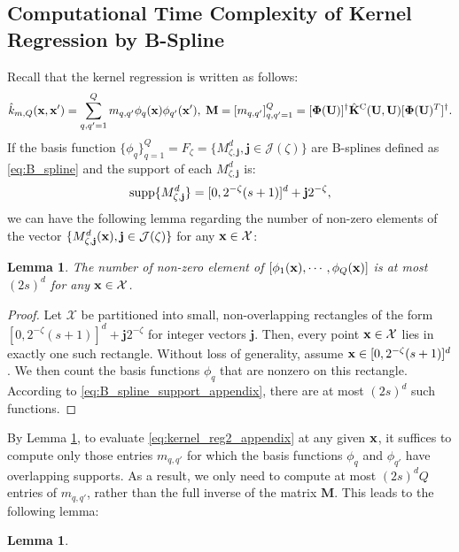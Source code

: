 \documentclass[aos,preprint]{imsart}
\theoremstyle{plain}
\newtheorem{lemma}[theorem]{Lemma}
\newcommand{\CalX}{\mathcal X}
\newcommand{\BFx}{\bold x}
\newcommand{\BU}{\bold U}
\newcommand{\BK}{\bold K}
\newcommand{\BPhi}{\boldsymbol{\Phi}}
\theoremstyle{remark}
\begin{document}
\begin{appendix}
\section{Computational Time Complexity of  Kernel Regression by B-Spline}
\label{sec:B_spline_time_complexity}
Recall that the kernel regression is written as follows:
\begin{equation}
\label{eq:kernel_reg2_appendix}
 \hat{k}_{m,Q}(\BFx, \BFx') = \sum_{q,q'=1}^Q m_{q,q'}{\phi}_q(\BFx) {\phi}_{q'}(\BFx'), \; \mathbf{M} = [m_{q,q'}]_{q,q'=1}^Q = [\BPhi(\BU)]^\dagger \hat{\BK}^{\rm C}(\BU, \BU) [\BPhi(\BU)^T]^\dagger.
\end{equation}
If the basis function $\{\phi_q\}_{q=1}^Q=F_\zeta=\{M_{\zeta, \mathbf{j}}^d, \mathbf{j}\in \mathcal{J}(\zeta)\}$ are B-splines defined as \eqref{eq:B_spline} and the support of each $M_{\zeta, \mathbf{j}}^d$ is:
\begin{equation}
\label{eq:B_spline_support_appendix}
    {\rm supp}\{M_{\zeta, \mathbf{j}}^d\}=[0,2^{-\zeta}(s+1)]^d+\bold{j}2^{-\zeta},
\end{equation}
we can have the following lemma regarding the number of non-zero elements of the vector $\{M_{\zeta, \mathbf{j}}^d(\BFx), \mathbf{j}\in \mathcal{J}(\zeta)\}$ for any $\BFx\in\CalX$:
\begin{lemma}
    \label{lem:nnz_B_spline}
     The number of non-zero element of $[\phi_1(\BFx),\cdots,\phi_Q(\BFx)]$ is at most $(2s)^d$ for any $\BFx\in\CalX$.
\end{lemma}
\begin{proof}
    Let $\CalX$ be partitioned into small, non-overlapping rectangles of the form ${[0, 2^{-\zeta}(s+1)]^d + \boldsymbol{j} 2^{-\zeta}}$ for integer vectors $\boldsymbol{j}$. Then, every point $\BFx \in \CalX$ lies in exactly one such rectangle. Without loss of generality, assume $\BFx \in [0, 2^{-\zeta}(s+1)]^d$. We then count the basis functions $\phi_q$ that are nonzero on this rectangle. According to \eqref{eq:B_spline_support_appendix}, there are at most $(2s)^d$ such functions.
\end{proof}
By Lemma \ref{lem:nnz_B_spline}, to evaluate \eqref{eq:kernel_reg2_appendix} at any given $\BFx$, it suffices to compute only those entries ${m_{q,q'}}$ for which the basis functions $\phi_q$ and $\phi_{q'}$ have overlapping supports. As a result, we only need to compute at most $(2s)^d Q$ entries of ${m_{q,q'}}$, rather than the full inverse of the matrix $\boldsymbol{M}$. This leads to the following lemma:
\begin{lemma}

\end{lemma}
\end{appendix}
\end{document}
